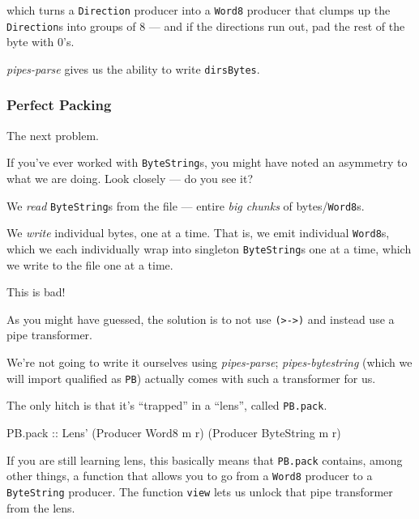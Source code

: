 \documentclass[]{article}
\newenvironment{Shaded}{\begin{snugshade}}{\end{snugshade}}
\newcommand{\DataTypeTok}[1]{\textcolor[rgb]{0.13,0.29,0.53}{#1}}
\newcommand{\NormalTok}[1]{#1}
\newcommand{\OtherTok}[1]{\textcolor[rgb]{0.56,0.35,0.01}{#1}}
\begin{document}
which turns a \texttt{Direction} producer into a \texttt{Word8} producer that
clumps up the \texttt{Direction}s into groups of 8 --- and if the directions run
out, pad the rest of the byte with 0's.

\emph{pipes-parse} gives us the ability to write \texttt{dirsBytes}.

\hypertarget{perfect-packing}{%
\subsubsection{Perfect Packing}\label{perfect-packing}}

The next problem.

If you've ever worked with \texttt{ByteString}s, you might have noted an
asymmetry to what we are doing. Look closely --- do you see it?

We \emph{read} \texttt{ByteString}s from the file --- entire \emph{big chunks}
of bytes/\texttt{Word8}s.

We \emph{write} individual bytes, one at a time. That is, we emit individual
\texttt{Word8}s, which we each individually wrap into singleton
\texttt{ByteString}s one at a time, which we write to the file one at a time.

This is bad!

As you might have guessed, the solution is to not use
\texttt{(\textgreater{}-\textgreater{})} and instead use a pipe transformer.

We're not going to write it ourselves using \emph{pipes-parse};
\emph{pipes-bytestring} (which we will import qualified as \texttt{PB}) actually
comes with such a transformer for us.

The only hitch is that it's ``trapped'' in a ``lens'', called \texttt{PB.pack}.

\begin{Shaded}
\begin{Highlighting}[]
\NormalTok{PB.pack}\OtherTok{ ::} \DataTypeTok{Lens'}\NormalTok{ (}\DataTypeTok{Producer} \DataTypeTok{Word8}\NormalTok{ m r) (}\DataTypeTok{Producer} \DataTypeTok{ByteString}\NormalTok{ m r)}
\end{Highlighting}
\end{Shaded}

If you are still learning lens, this basically means that \texttt{PB.pack}
contains, among other things, a function that allows you to go from a
\texttt{Word8} producer to a \texttt{ByteString} producer. The function
\texttt{view} lets us unlock that pipe transformer from the lens.
\end{document}

